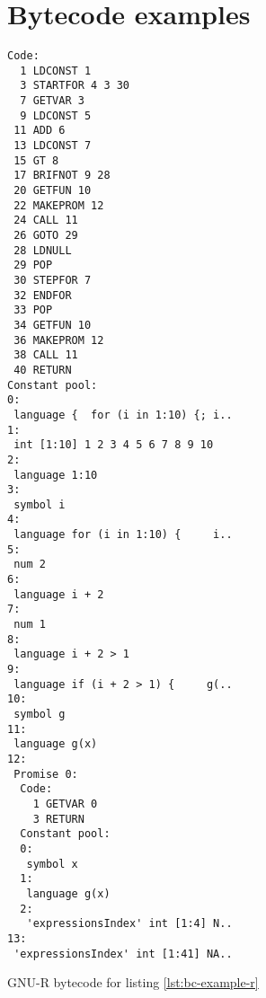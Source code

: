 \chapter{Bytecode examples}\label{ch:appendix-bc}

\begin{listing}[h]
	\begin{multicols}{2}
		\begin{verbatim}
Code:
  1 LDCONST 1
  3 STARTFOR 4 3 30
  7 GETVAR 3
  9 LDCONST 5
 11 ADD 6
 13 LDCONST 7
 15 GT 8
 17 BRIFNOT 9 28
 20 GETFUN 10
 22 MAKEPROM 12
 24 CALL 11
 26 GOTO 29
 28 LDNULL
 29 POP
 30 STEPFOR 7
 32 ENDFOR
 33 POP
 34 GETFUN 10
 36 MAKEPROM 12
 38 CALL 11
 40 RETURN
Constant pool:
0:
 language {  for (i in 1:10) {; i..
1:
 int [1:10] 1 2 3 4 5 6 7 8 9 10
2:
 language 1:10
3:
 symbol i
4:
 language for (i in 1:10) {     i..
5:
 num 2
6:
 language i + 2
7:
 num 1
8:
 language i + 2 > 1
9:
 language if (i + 2 > 1) {     g(..
10:
 symbol g
11:
 language g(x)
12:
 Promise 0:
  Code:
    1 GETVAR 0
    3 RETURN
  Constant pool:
  0:
   symbol x
  1:
   language g(x)
  2:
   'expressionsIndex' int [1:4] N..
13:
 'expressionsIndex' int [1:41] NA..
    \end{verbatim}
	\end{multicols}
	\caption{GNU-R bytecode for listing \ref{lst:bc-example-r}}\label{lst:appendix-gnur}
\end{listing}

